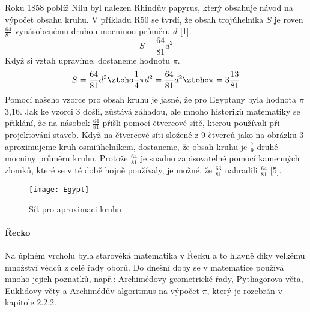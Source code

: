 \documentclass[soc]{gzwroc} %
\begin{document}
Roku 1858 poblíž Nilu byl nalezen Rhindův papyrus, který obsahuje návod na výpočet obsahu kruhu. V příkladu R50 se tvrdí, že obsah trojúhelníka $S$ je roven $\frac{64}{81}$ vynásobenému druhou mocninou průměru $d$ [1].
\begin{equation}
S=\frac{64}{81}d^2
\end{equation}
Když si vztah upravíme, dostaneme hodnotu $\pi$.
$$
S=\frac{64}{81}d^2 \ztoho \frac{1}{4}\pi d^2=\frac{64}{81}d^2 \ztoho \pi=3\frac{13}{81}
$$
Pomocí našeho vzorce pro obsah kruhu je jasné, že pro Egypťany byla hodnota $\pi$ 3,16. Jak ke vzorci 3 došli, zůstává záhadou, ale mnoho historiků matematiky se přiklání, že na násobek $\frac{64}{81}$ přišli pomocí čtvercové sítě, kterou používali při projektování staveb. Když na čtvercové síti složené z 9 čtverců jako na obrázku 3 aproximujeme kruh osmiúhelníkem, dostaneme, že obsah kruhu je $\frac{7}{9}$ druhé mocniny průměru kruhu. Protože $\frac{64}{81}$ je snadno zapisovatelné pomocí kamenných zlomků, které se v té době hojně používaly, je možné, že $\frac{63}{81}$ nahradili $\frac{64}{81}$ [5].
\begin{figure}[!ht]
\texttt{[image: Egypt]}
\caption{Síť pro aproximaci kruhu}
\label{fig:kruh}
\end{figure}
\paragraph{Řecko}
Na úplném vrcholu byla starověká matematika v Řecku a to hlavně díky velkému množství vědců z celé řady oborů. Do dnešní doby se v matematice používá mnoho jejich poznatků, např.: Archimédovy geometrické řady, Pythagorova věta, Euklidovy věty a Archimédův algoritmus na výpočet $\pi$, který je rozebrán v kapitole 2.2.2.
\end{document}
